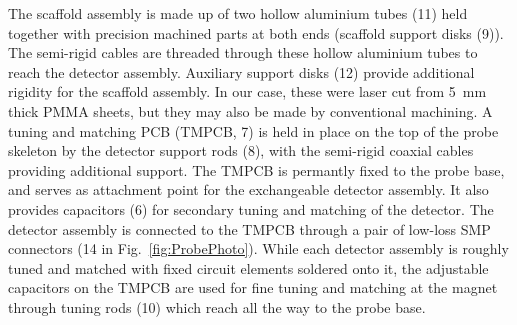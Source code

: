 \documentclass[preprint,5p]{elsarticle}
\newcommand{\fig}[1]{Fig.~\ref{#1}}
\begin{document}
The scaffold assembly is made up of two hollow aluminium tubes (11) held together with 
precision machined parts at both ends (scaffold support disks (9)). 
The semi-rigid cables are  threaded through these hollow aluminium tubes 
to reach the detector assembly. 
Auxiliary support disks (12) provide additional rigidity for the scaffold assembly. 
In our case, these were laser cut from 5~mm thick PMMA sheets, 
but they may also be made by conventional machining.
A tuning and matching PCB (TMPCB, 7) is held in place on the top of the probe skeleton by
the detector support rods (8), with the semi-rigid coaxial cables providing
additional support.
The TMPCB is permantly fixed to the probe base, and serves as attachment point
for the exchangeable detector assembly. It also provides 
capacitors (6) for secondary tuning and matching of the detector.
The detector assembly is connected to the TMPCB through a pair of
low-loss SMP connectors (14 in \fig{fig:ProbePhoto}).
While each detector assembly is roughly
tuned and matched with fixed circuit elements soldered onto it,
the adjustable capacitors on the TMPCB are used for 
fine tuning and matching 
at the magnet through tuning rods (10) which reach all the way to the probe base. 
\end{document}
